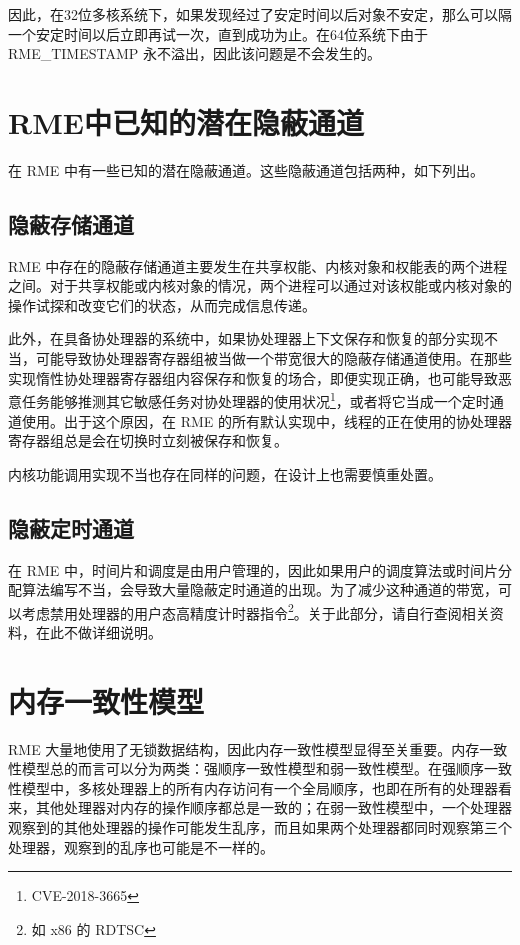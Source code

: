 因此，在32位多核系统下，如果发现经过了安定时间以后对象不安定，那么可以隔一个安定时间以后立即再试一次，直到成功为止。在64位系统下由于 RME\_TIMESTAMP 永不溢出，因此该问题是不会发生的。

\section{RME中已知的潜在隐蔽通道}\label{sec:9-known-covert-channels}

在 RME 中有一些已知的潜在隐蔽通道。这些隐蔽通道包括两种，如下列出。

\subsection{隐蔽存储通道}\label{subsec:9-covert-storage-channel}

RME 中存在的隐蔽存储通道主要发生在共享权能、内核对象和权能表的两个进程之间。对于共享权能或内核对象的情况，两个进程可以通过对该权能或内核对象的操作试探和改变它们的状态，从而完成信息传递。

此外，在具备协处理器的系统中，如果协处理器上下文保存和恢复的部分实现不当，可能导致协处理器寄存器组被当做一个带宽很大的隐蔽存储通道使用。在那些实现惰性协处理器寄存器组内容保存和恢复的场合，即便实现正确，也可能导致恶意任务能够推测其它敏感任务对协处理器的使用状况\footnote{CVE-2018-3665}，或者将它当成一个定时通道使用。出于这个原因，在 RME 的所有默认实现中，线程的正在使用的协处理器寄存器组总是会在切换时立刻被保存和恢复。

内核功能调用实现不当也存在同样的问题，在设计上也需要慎重处置。

\subsection{隐蔽定时通道}\label{subsec:9-covert-timing-channel}

在 RME 中，时间片和调度是由用户管理的，因此如果用户的调度算法或时间片分配算法编写不当，会导致大量隐蔽定时通道的出现。为了减少这种通道的带宽，可以考虑禁用处理器的用户态高精度计时器指令\footnote{如 x86 的 RDTSC}。关于此部分，请自行查阅相关资料，在此不做详细说明。

\section{内存一致性模型}\label{sec:9-memory-consistency-model}

RME 大量地使用了无锁数据结构，因此内存一致性模型显得至关重要。内存一致性模型总的而言可以分为两类：强顺序一致性模型和弱一致性模型。在强顺序一致性模型中，多核处理器上的所有内存访问有一个全局顺序，也即在所有的处理器看来，其他处理器对内存的操作顺序都总是一致的；在弱一致性模型中，一个处理器观察到的其他处理器的操作可能发生乱序，而且如果两个处理器都同时观察第三个处理器，观察到的乱序也可能是不一样的。

